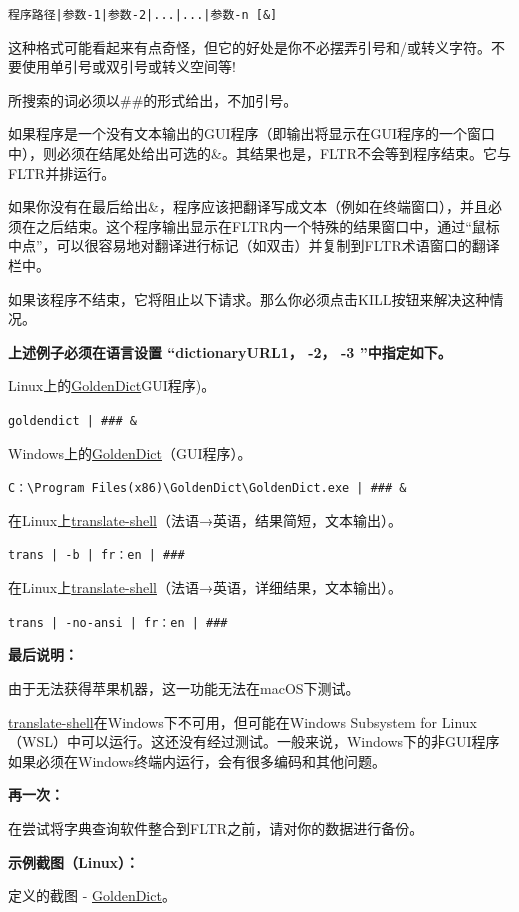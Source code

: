 \documentclass[cn,10pt,math=newtx,citestyle=gb7714-2015,bibstyle=gb7714-2015]{elegantbook}
\newcommand{\goldendict}{\href{http://goldendict.org/}{GoldenDict}}
\newcommand{\translateshell}{\href{https://github.com/soimort/translate-shell}{translate-shell}}
\begin{document}
\lstinline{程序路径|参数-1|参数-2|...|...|参数-n [&]}



这种格式可能看起来有点奇怪，但它的好处是你不必摆弄引号和/或转义字符。不要使用单引号或双引号或转义空间等!

所搜索的词必须以\#\#的形式给出，不加引号。

如果程序是一个没有文本输出的GUI程序（即输出将显示在GUI程序的一个窗口中），则必须在结尾处给出可选的\&。其结果也是，FLTR不会等到程序结束。它与FLTR并排运行。

如果你没有在最后给出\&，程序应该把翻译写成文本（例如在终端窗口），并且必须在之后结束。这个程序输出显示在FLTR内一个特殊的结果窗口中，通过“鼠标中点”，可以很容易地对翻译进行标记（如双击）并复制到FLTR术语窗口的翻译栏中。

如果该程序不结束，它将阻止以下请求。那么你必须点击KILL按钮来解决这种情况。


\textbf{上述例子必须在语言设置 “dictionaryURL1， -2， -3 ”中指定如下。}

Linux上的\goldendict GUI程序)。

\lstinline{goldendict | ### &}

Windows上的\goldendict （GUI程序）。

\lstinline{C：\Program Files(x86)\GoldenDict\GoldenDict.exe | ### &}

在Linux上\translateshell（法语→英语，结果简短，文本输出）。

\lstinline{trans | -b | fr：en | ###}

在Linux上\translateshell（法语→英语，详细结果，文本输出）。

\lstinline{trans | -no-ansi | fr：en | ###}

\textbf{最后说明：}

由于无法获得苹果机器，这一功能无法在macOS下测试。

\translateshell 在Windows下不可用，但可能在Windows Subsystem for Linux（WSL）中可以运行。这还没有经过测试。一般来说，Windows下的非GUI程序如果必须在Windows终端内运行，会有很多编码和其他问题。

\textbf{再一次：}


在尝试将字典查询软件整合到FLTR之前，请对你的数据进行备份。


\textbf{示例截图（Linux）：}

定义的截图 - \goldendict 。
\end{document}
